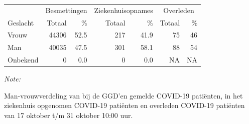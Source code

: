 \documentclass[
  english,
  man,floatsintext]{apa6}
\begin{document}
\begin{table}
\centering\begingroup\fontsize{11}{13}\selectfont

\begin{threeparttable}
\begin{tabular}{lrrrrrr}
\toprule
\multicolumn{1}{c}{ } & \multicolumn{2}{c}{Besmettingen} & \multicolumn{2}{c}{Ziekenhuisopnames} & \multicolumn{2}{c}{Overleden} \\
\cmidrule(l{3pt}r{3pt}){2-3} \cmidrule(l{3pt}r{3pt}){4-5} \cmidrule(l{3pt}r{3pt}){6-7}
Geslacht & Totaal & \% & Totaal & \% & Totaal & \%\\
\midrule
Vrouw & 44306 & 52.5 & 217 & 41.9 & 75 & 46\\
Man & 40035 & 47.5 & 301 & 58.1 & 88 & 54\\
Onbekend & 0 & 0.0 & 0 & 0.0 & NA & NA\\
\bottomrule
\end{tabular}
\begin{tablenotes}
\item \textit{Note: } 
\item Man-vrouwverdeling van bij de GGD’en gemelde COVID-19 patiënten, in het ziekenhuis opgenomen COVID-19 patiënten en overleden COVID-19 patiënten van 17 oktober t/m 31 oktober 10:00 uur.
\end{tablenotes}
\end{threeparttable}
\endgroup{}
\end{table}
\newpage
\end{document}
